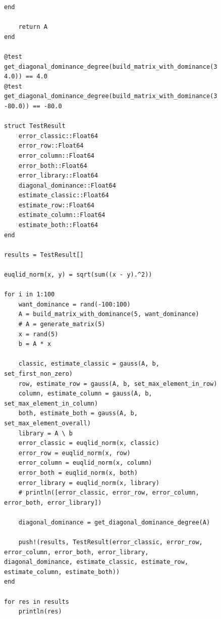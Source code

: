\documentclass[a4paper, 14pt]{extarticle}
\begin{document}
\begin{figure}[!htb]
\begin{lstlisting}[language={},caption={Метод Гаусса (продолжение)},label={lst:code6}]
    end

    return A
end

@test get_diagonal_dominance_degree(build_matrix_with_dominance(3, 4.0)) == 4.0
@test get_diagonal_dominance_degree(build_matrix_with_dominance(3, -80.0)) == -80.0

struct TestResult
    error_classic::Float64
    error_row::Float64
    error_column::Float64
    error_both::Float64
    error_library::Float64
    diagonal_dominance::Float64
    estimate_classic::Float64
    estimate_row::Float64
    estimate_column::Float64
    estimate_both::Float64
end

results = TestResult[]

euqlid_norm(x, y) = sqrt(sum((x - y).^2))

for i in 1:100
    want_dominance = rand(-100:100)
    A = build_matrix_with_dominance(5, want_dominance)
    # A = generate_matrix(5)
    x = rand(5)
    b = A * x

    classic, estimate_classic = gauss(A, b, set_first_non_zero)
    row, estimate_row = gauss(A, b, set_max_element_in_row)
    column, estimate_column = gauss(A, b, set_max_element_in_column)
    both, estimate_both = gauss(A, b, set_max_element_overall)
    library = A \ b
    error_classic = euqlid_norm(x, classic)
    error_row = euqlid_norm(x, row)
    error_column = euqlid_norm(x, column)
    error_both = euqlid_norm(x, both)
    error_library = euqlid_norm(x, library)
    # println([error_classic, error_row, error_column, error_both, error_library])

    diagonal_dominance = get_diagonal_dominance_degree(A)

    push!(results, TestResult(error_classic, error_row, error_column, error_both, error_library, diagonal_dominance, estimate_classic, estimate_row, estimate_column, estimate_both))
end

for res in results
    println(res)
\end{lstlisting}
\end{figure}
\end{document}
